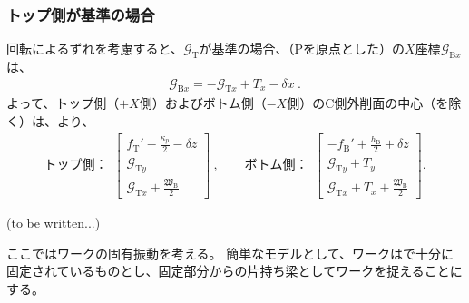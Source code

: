 \subsubsection{トップ側が基準の場合}
回転によるずれを考慮すると、\TopOutcutCenter$\mathcal G_\mathrm T$が基準の場合、（\TableCenter Pを原点とした）\BottomOutcutCenter の$X$座標$\mathcal G_{\mathrm Bx}$は、
\begin{align*}
  \mathcal G_{\mathrm Bx} = -\mathcal G_{\mathrm Tx}+T_x-\delta x\ .
\end{align*}
よって、トップ側（$+X$側）およびボトム側（$-X$側）のC側外削面の中心（\Keyway を除く）は、より、
\begin{align*}
  \text{トップ側：}~~
  \left[
    \begin{array}{c}
      \displaystyle f_\mathrm T'-\frac{\kappa_p}2-\delta z\\[5pt]
      \mathcal G_{\mathrm Ty}\\[3pt]
      \displaystyle \mathcal G_{\mathrm Tx}+\frac{\mathfrak W_\mathrm B}2
    \end{array}
    \right]~, \qquad
  \text{ボトム側：}~~
  \left[
    \begin{array}{c}
      \displaystyle -f_\mathrm B'+\frac{h_\mathrm B}2+\delta z\\[5pt]
      \mathcal G_{\mathrm Ty}+T_y\\[3pt]
      \displaystyle \mathcal G_{\mathrm Tx}+T_x+\frac{\mathfrak W_\mathrm B}2
    \end{array}
  \right].
\end{align*}



\clearpage
(to be written...)



\clearpage
ここではワークの固有振動を考える。
簡単なモデルとして、ワークは\Jig で十分に固定されているものとし、固定部分からの片持ち梁としてワークを捉えることにする。


